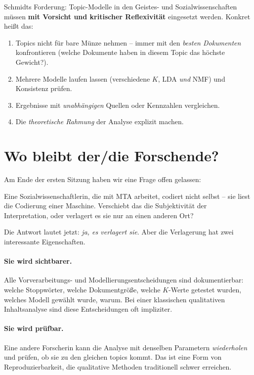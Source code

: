 \documentclass[a4paper,11pt]{article}
\begin{document}
Schmidts Forderung: Topic-Modelle in den Geistes- und
Sozialwissenschaften müssen \textbf{mit Vorsicht und kritischer
Reflexivität} eingesetzt werden. Konkret heißt das:

\begin{enumerate}
\item Topics nicht für bare Münze nehmen -- immer mit den
\emph{besten Dokumenten} konfrontieren (welche Dokumente haben in
diesem Topic das höchste Gewicht?).
\item Mehrere Modelle laufen lassen (verschiedene $K$, LDA \emph{und}
NMF) und Konsistenz prüfen.
\item Ergebnisse mit \emph{unabhängigen} Quellen oder Kennzahlen
vergleichen.
\item Die \emph{theoretische Rahmung} der Analyse explizit machen.
\end{enumerate}

\section{Wo bleibt der/die Forschende?}

Am Ende der ersten Sitzung haben wir eine Frage offen gelassen:

\begin{merkbox}
Eine Sozialwissenschaftlerin, die mit MTA arbeitet, codiert nicht
selbst -- sie liest die Codierung einer Maschine. Verschiebt das die
Subjektivität der Interpretation, oder verlagert es sie nur an einen
anderen Ort?
\end{merkbox}

Die Antwort lautet jetzt: \emph{ja, es verlagert sie}. Aber die
Verlagerung hat zwei interessante Eigenschaften.

\paragraph{Sie wird sichtbarer.} Alle Vorverarbeitungs- und
Modellierungsentscheidungen sind dokumentierbar: welche Stoppwörter,
welche Dokumentgröße, welche $K$-Werte getestet wurden, welches Modell
gewählt wurde, warum. Bei einer klassischen qualitativen Inhaltsanalyse
sind diese Entscheidungen oft impliziter.

\paragraph{Sie wird prüfbar.} Eine andere Forscherin kann die Analyse
mit denselben Parametern \emph{wiederholen} und prüfen, ob sie zu den
gleichen topics kommt. Das ist eine Form von Reproduzierbarkeit, die
qualitative Methoden traditionell schwer erreichen.
\end{document}
